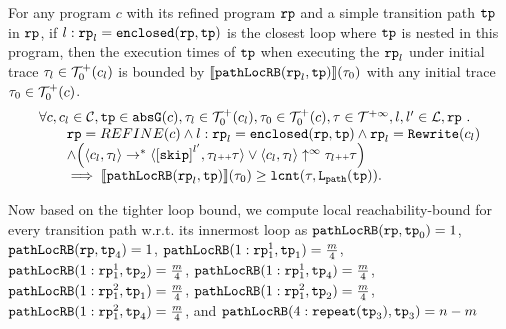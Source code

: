 \begin{lem}
  \label{lem:pathlocalrb-sound}
  For any program $c$ with its refined program $\mathtt{rp}$ and a simple transition path $\mathtt{tp}$ in $\mathtt{rp}$,
  if $l: \mathtt{rp}_l = \mathtt{enclosed}(\mathtt{rp}, \mathtt{tp})$ is the closest loop where $\mathtt{tp}$ is nested in this program,
  then the execution times of $\mathtt{tp}$ when executing the $\mathtt{rp}_l$ under initial trace $\mathtt{\tau}_l \in \mathcal{T}^{+}_0(c_l)$ is bounded by $\llbracket \mathtt{pathLocRB}(\mathtt{rp}_l, \mathtt{tp}) \rrbracket(\mathtt{\tau}_0)$ with any initial trace $\mathtt{\tau}_0 \in \mathcal{T}^{+}_0(c)$.
  \[
    \begin{array}{l}
    \forall c, c_l \in \cdom, \tpath \in \absG(c), 
    \trace_l \in \ftdom_0(c_l), \trace_0 \in \ftdom_0(c), \trace \in \tdom, l, l' \in \ldom, \rprog \st 
    \\ \qquad
    \rprog = REFINE(c)
    \land
    l: \rprog_l = \kw{enclosed}(\rprog, \tpath)
    \land 
    \rprog_l = \algrewrite(c_l)
    \\ \qquad
    \land
    \Big(
    \config{c_l, \trace_l} \rightarrow^* \config{\clabel{\eskip}^{l'}, \trace_l \tracecat \trace}
    \lor \config{c_l, \trace_l} \uparrow^{\infty} \trace_l \tracecat \trace 
    \Big)
    \\ \qquad
    \implies
    \econfig{\outinB(\rprog_l, \tpath)}(\trace_0) \geq \lcounter(\trace, \pathl(\tpath)).
    \end{array}
  \]  
\end{lem}


Now based on the tighter loop bound,
we compute local reachability-bound for every transition path w.r.t. its innermost loop as
$\mathtt{pathLocRB}(\mathtt{rp}, \mathtt{tp}_0) = 1$,
$\mathtt{pathLocRB}(\mathtt{rp}, \mathtt{tp}_4) = 1$,
$\mathtt{pathLocRB}(1: \mathtt{rp}_1^1, \mathtt{tp}_1) = \frac{m}{4}$,
$\mathtt{pathLocRB}(1: \mathtt{rp}_1^1, \mathtt{tp}_2) = \frac{m}{4}$,
$\mathtt{pathLocRB}(1: \mathtt{rp}_1^1, \mathtt{tp}_4) = \frac{m}{4}$,
$\mathtt{pathLocRB}(1: \mathtt{rp}_1^2, \mathtt{tp}_1) = \frac{m}{4}$,
$\mathtt{pathLocRB}(1: \mathtt{rp}_1^2, \mathtt{tp}_2) = \frac{m}{4}$,
$\mathtt{pathLocRB}(1: \mathtt{rp}_1^2, \mathtt{tp}_4) = \frac{m}{4}$, and
$\mathtt{pathLocRB}(4: \mathtt{repeat}(\mathtt{tp}_3), \mathtt{tp}_3) = n - m$ 

